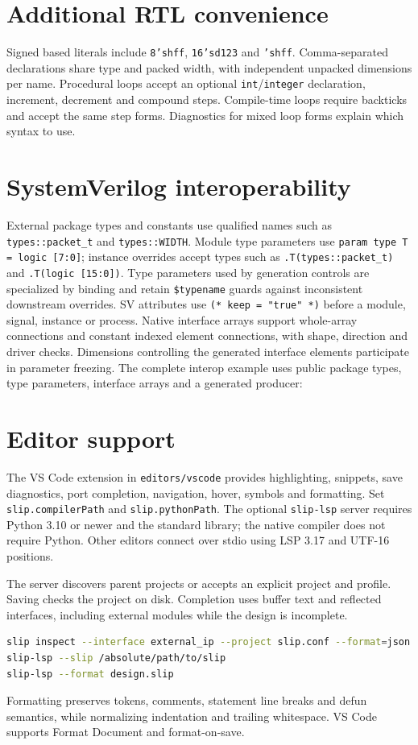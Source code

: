 \documentclass[lang=en,11pt]{elegantbook}
\newcommand{\code}[1]{\texttt{#1}}
\begin{document}
\section{Additional RTL convenience}
Signed based literals include \code{8'shff}, \code{16'sd123} and \code{'shff}.
Comma-separated declarations share type and packed width, with independent
unpacked dimensions per name. Procedural loops accept an optional
\code{int}/\code{integer} declaration, increment, decrement and compound steps.
Compile-time loops require backticks and accept the same step forms. Diagnostics
for mixed loop forms explain which syntax to use.


\section{SystemVerilog interoperability}
External package types and constants use qualified names such as
\code{types::packet\_t} and \code{types::WIDTH}. Module type parameters use
\code{param type T = logic [7:0]}; instance overrides accept types such as
\code{.T(types::packet\_t)} and \code{.T(logic [15:0])}.
Type parameters used by generation controls are specialized by binding and retain
\code{\$typename} guards against inconsistent downstream overrides.
SV attributes use \code{(* keep = "true" *)} before a module, signal, instance
or process. Native interface arrays support whole-array connections and constant
indexed element connections, with shape, direction and driver checks.
Dimensions controlling the generated interface elements participate in parameter
freezing. The complete interop example uses public package types, type parameters,
interface arrays and a generated producer:


\section{Editor support}
The VS Code extension in \code{editors/vscode} provides highlighting, snippets,
save diagnostics, port completion, navigation, hover, symbols and formatting.
Set \code{slip.compilerPath} and \code{slip.pythonPath}. The optional
\code{slip-lsp} server requires Python 3.10 or newer and the standard library;
the native compiler does not require Python. Other editors connect over stdio
using LSP 3.17 and UTF-16 positions.

The server discovers parent projects or accepts an explicit project and profile.
Saving checks the project on disk. Completion uses buffer text and reflected
interfaces, including external modules while the design is incomplete.
\begin{lstlisting}[language=bash]
slip inspect --interface external_ip --project slip.conf --format=json
slip-lsp --slip /absolute/path/to/slip
slip-lsp --format design.slip
\end{lstlisting}
Formatting preserves tokens, comments, statement line breaks and defun semantics,
while normalizing indentation and trailing whitespace. VS Code supports
Format Document and format-on-save.
\end{document}
